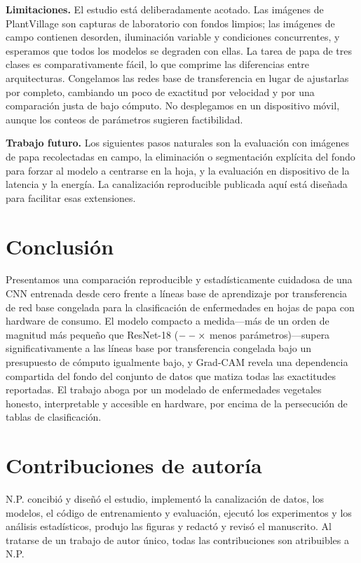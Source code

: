 \documentclass[10pt]{article}
\begin{document}
\textbf{Limitaciones.} El estudio está deliberadamente acotado. Las imágenes de
PlantVillage son capturas de laboratorio con fondos limpios; las imágenes de campo
contienen desorden, iluminación variable y condiciones concurrentes, y esperamos que
todos los modelos se degraden con ellas. La tarea de papa de tres clases es
comparativamente fácil, lo que comprime las diferencias entre arquitecturas. Congelamos
las redes base de transferencia en lugar de ajustarlas por completo, cambiando un poco
de exactitud por velocidad y por una comparación justa de bajo cómputo. No desplegamos
en un dispositivo móvil, aunque los conteos de parámetros sugieren factibilidad.

\textbf{Trabajo futuro.} Los siguientes pasos naturales son la evaluación con imágenes
de papa recolectadas en campo, la eliminación o segmentación explícita del fondo para
forzar al modelo a centrarse en la hoja, y la evaluación en dispositivo de la latencia
y la energía. La canalización reproducible publicada aquí está diseñada para facilitar
esas extensiones.

\section{Conclusión}
Presentamos una comparación reproducible y estadísticamente cuidadosa de una CNN
entrenada desde cero frente a líneas base de aprendizaje por transferencia de red base
congelada para la clasificación de enfermedades en hojas de papa con hardware de
consumo. El modelo compacto a medida---más de un orden de magnitud más pequeño que
ResNet-18 ($--\times$ menos parámetros)---supera significativamente a las
líneas base por transferencia congelada bajo un presupuesto de cómputo igualmente bajo,
y Grad-CAM revela una dependencia compartida del fondo del conjunto de datos que matiza
todas las exactitudes reportadas. El trabajo aboga por un modelado de enfermedades
vegetales honesto, interpretable y accesible en hardware, por encima de la persecución
de tablas de clasificación.

\section*{Contribuciones de autoría}
N.P. concibió y diseñó el estudio, implementó la canalización de datos, los modelos, el
código de entrenamiento y evaluación, ejecutó los experimentos y los análisis
estadísticos, produjo las figuras y redactó y revisó el manuscrito. Al tratarse de un
trabajo de autor único, todas las contribuciones son atribuibles a N.P.
\end{document}
